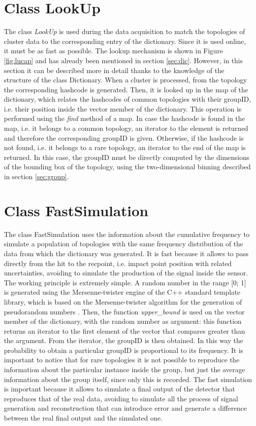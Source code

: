 \section{Class LookUp}
The class \textit{LookUp} is used during the data acquisition to match the topologies of cluster data to the corresponding entry of the dictionary. Since it is used online, it must be as fast as possible. The lookup mechanism is shown in Figure \ref{fig:lucap} and has already been mentioned in section \ref{sec:dic}. However, in this section it can be described more in detail thanks to the knowledge of the structure of the class Dictionary. When a cluster is processed, from the topology the corresponding hashcode is generated. Then, it is looked up in the map of the dictionary, which relates the hashcodes of common topologies with their groupID, i.e. their position inside the vector member of the dictionary. This operation is performed using the \textit{find} method of a map. In case the hashcode is found in the map, i.e. it belongs to a common topology, an iterator to the element is returned and therefore the corresponding groupID is given. Otherwise, if the hashcode is not found, i.e. it belongs to a rare topology, an iterator to the end of the map is returned. In this case, the groupID must be directly computed by the dimensions of the bounding box of the topology, using the two-dimensional binning described in section \ref{sec:group}.
\section{Class FastSimulation}
\label{sec:fast}
The class FastSimulation uses the information about the cumulative frequency to simulate a population of topologies with the same frequency distribution of the data from which the dictionary was generated. It is fast because it allows to pass directly from the hit to the recpoint, i.e. impact point position with related uncertainties, avoiding to simulate the production of the signal inside the sensor. The working principle is extremely simple. A random number in the range [0; 1] is generated using the Mersenne-twister engine of the C++ standard template library, which is based on the Mersenne-twister algorithm for the generation of pseudorandom numbers \cite{mersenne}. Then, the function \textit{upper\_bound} is used on the vector member of the dictionary, with the random number as argument: this function returns an iterator to the first element of the vector that compares greater than the argument. From the iterator, the groupID is then obtained. In this way the probability to obtain a particular groupID is proportional to its frequency. It is important to notice that for rare topologies it is not possible to reproduce the information about the particular instance inside the group, but just the average information about the group itself, since only this is recorded. The fast simulation is important because it allows to simulate a final output of the detector that reproduces that of the real data, avoiding to simulate all the process of signal generation and reconstruction that can introduce error and generate a difference between the real final output and the simulated one. 
%
